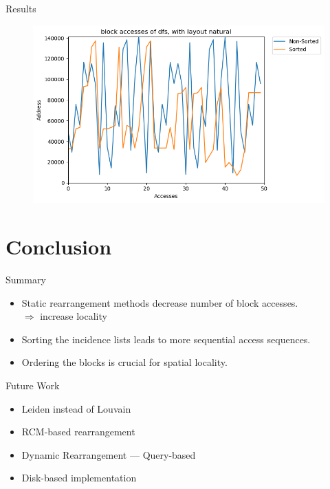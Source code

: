\documentclass[rgb]{beamer}
\begin{document}
\begin{frame}[allowframebreaks]{Results}
            \framebreak
            \begin{figure}
                \begin{center}
                \includegraphics[keepaspectratio, height=0.8\textheight, width=\textwidth]{img/dblp_natural_dfs_block_sil_access_seq.png}
                \end{center}
            \end{figure}
        \end{frame}
    
    \section{Conclusion}
        \begin{frame}{Summary}
            \begin{itemize}
                \item Static rearrangement methods decrease number of block accesses. \\
                $\Rightarrow$ increase locality \\ [1em]
                \item Sorting the incidence lists leads to more sequential access sequences. \\ [1em]
                \item Ordering the blocks is crucial for spatial locality.
                \end{itemize}
        \end{frame}
    
        \begin{frame}{Future Work}
        \begin{itemize}
            \item Leiden instead of Louvain \\ [1em]
            \item RCM-based rearrangement \\ [1em]
            \item  Dynamic Rearrangement --- Query-based \\ [1em]
            \item Disk-based implementation
        \end{itemize}
        \end{frame}
        
    \printbibliography
\end{document}
